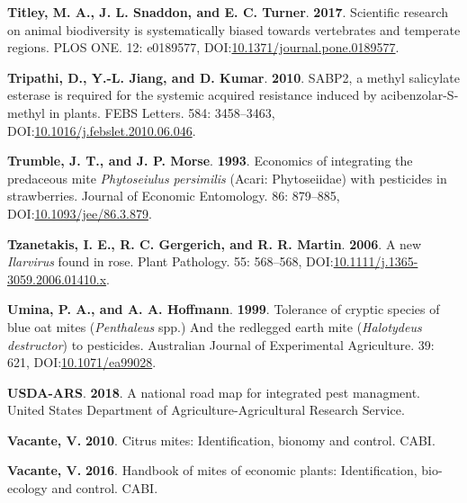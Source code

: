 \documentclass[12pt,final,CPage]{ufthesis}
\newlength{\cslhangindent}
\newenvironment{CSLReferences}[2] %
{%
	\setlength{\parindent}{0pt}
	\ifodd #1 \everypar{\setlength{\hangindent}{\cslhangindent}}\ignorespaces\fi
	\ifnum #2 > 0
	\setlength{\parskip}{#2\baselineskip}
	\fi
}%
{}
\begin{document}
{\begin{CSLReferences}{1}{0}
  \leavevmode{}%
  \textbf{Titley, M. A., J. L. Snaddon, and E. C. Turner}. \textbf{2017}. Scientific research on animal biodiversity is systematically biased towards vertebrates and temperate regions. {PLOS} {ONE}. 12: e0189577, DOI:\href{https://doi.org/10.1371/journal.pone.0189577}{10.1371/journal.pone.0189577}.

  \leavevmode{}%
  \textbf{Tripathi, D., Y.-L. Jiang, and D. Kumar}. \textbf{2010}. {SABP}2, a methyl salicylate esterase is required for the systemic acquired resistance induced by acibenzolar-{S}-methyl in plants. {FEBS} Letters. 584: 3458--3463, DOI:\href{https://doi.org/10.1016/j.febslet.2010.06.046}{10.1016/j.febslet.2010.06.046}.

  \leavevmode{}%
  \textbf{Trumble, J. T., and J. P. Morse}. \textbf{1993}. Economics of integrating the predaceous mite {\emph{Phytoseiulus persimilis}} ({{Acari}: {Phytoseiidae}}) with pesticides in strawberries. Journal of Economic Entomology. 86: 879--885, DOI:\href{https://doi.org/10.1093/jee/86.3.879}{10.1093/jee/86.3.879}.

  \leavevmode{}%
  \textbf{Tzanetakis, I. E., R. C. Gergerich, and R. R. Martin}. \textbf{2006}. A new {\emph{Ilarvirus}} found in rose. Plant Pathology. 55: 568--568, DOI:\href{https://doi.org/10.1111/j.1365-3059.2006.01410.x}{10.1111/j.1365-3059.2006.01410.x}.

  \leavevmode{}%
  \textbf{Umina, P. A., and A. A. Hoffmann}. \textbf{1999}. Tolerance of cryptic species of blue oat mites ({\emph{Penthaleus}} spp.) And the redlegged earth mite ({\emph{Halotydeus destructor}}) to pesticides. Australian Journal of Experimental Agriculture. 39: 621, DOI:\href{https://doi.org/10.1071/ea99028}{10.1071/ea99028}.

  \leavevmode{}%
  \textbf{USDA-ARS}. \textbf{2018}. A national road map for integrated pest managment. {United States} Department of Agriculture-Agricultural Research Service.

  \leavevmode{}%
  \textbf{Vacante, V.} \textbf{2010}. Citrus mites: Identification, bionomy and control. CABI.

  \leavevmode{}%
  \textbf{Vacante, V.} \textbf{2016}. Handbook of mites of economic plants: Identification, bio-ecology and control. CABI.


\end{CSLReferences}}
\end{document}
